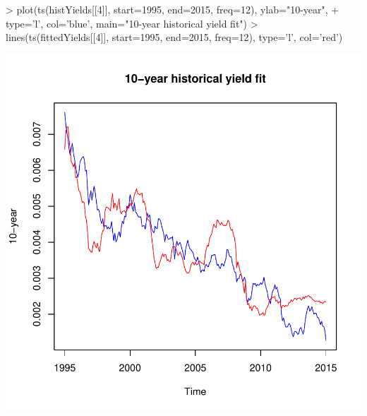 \documentclass[12pt]{article}
\begin{document}
\begin{Schunk}
\begin{Sinput}
> plot(ts(histYields[[4]], start=1995, end=2015, freq=12), ylab="10-year", 
+   type='l', col='blue', main="10-year historical yield fit")
> lines(ts(fittedYields[[4]], start=1995, end=2015, freq=12), type='l', col='red')
\end{Sinput}
\end{Schunk}
\includegraphics{pricing_kernel_demo-008}
\end{document}
